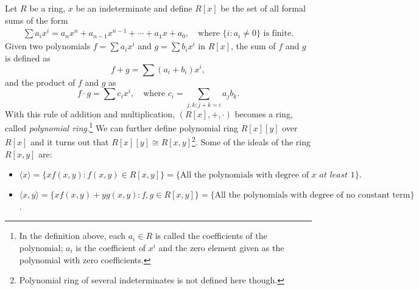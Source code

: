 \begin{example}
    Let $R$ be a ring, $x$ be an indeterminate and define $R[x]$ be the set of all formal sums of the form
    \begin{align*}
        \sum a_ix^i = a_nx^n + a_{n-1}x^{n-1} + \cdots + a_1x + a_0, \quad \text{where } \{i: a_i \neq 0\} \text{ is finite}.
    \end{align*}
    Given two polynomials $f = \sum a_ix^i$ and $g = \sum b_ix^i$ in $R[x]$, the sum of $f$ and $g$ is defined as
        \[f + g = \sum (a_i + b_i)x^i,\]
    and the product of $f$ and $g$ as
    \[f \cdot g = \sum c_ix^i, \quad \text{where } c_i = \sum_{j,k: j + k = i} a_j b_k.
\]
    With this rule of addition and multiplication, $(R[x], +, \cdot)$ becomes a ring, called \textit{polynomial ring}.\footnote{In the definition above, each $a_i \in R$ is called the coefficients of the polynomial; $a_i$ is the coefficient of $x^i$ and the zero element given as the polynomial with zero coefficients.}
    We can further define polynomial ring \(R[x][y]\) over \(R[x]\) and it turns out that \(R[x][y] \cong R[x, y]\)\footnote{Polynomial ring of several indeterminates is not defined here though.}. Some of the ideals of the ring \(R[x, y]\) are: 
    \begin{itemize}
        \item \[\langle x \rangle = \{x f(x, y) : f(x, y) \in R[x, y]\} = \{\text{All the polynomials with degree of }x\textit{ at least }1\}.\]
        \item \(\langle x, y \rangle = \{x f(x, y) + y g(x, y) : f, g \in R[x, y]\} = \{\text{All the polynomials with degree of no constant term}\}\).
    \end{itemize}
\end{example}
